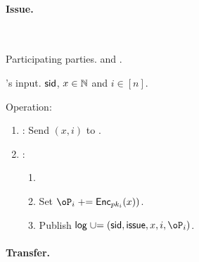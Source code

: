 \paragraph{Issue.}
\begin{protocol}~\label{prot:ConfidentialTransactions:Issue}
	\item[Participating parties.] \Ic and \Cc.
	
	
	\item[\Cc's input.] $\mathsf{sid}$, $x\in {\mathbb{N}}$ and $i\in [n]$.
	
	\item[Operation:] ~
	
	
	\begin{enumerate}
		
		\item   \Ic: Send $(x,i)$ to \Cc.
		
		\item \Cc:  
		\begin{enumerate}
			\item {}
			
			\item Set $\oP_i \pluseq \Enc_{pk_i}(x))$.
				
		\item Publish $\historylog \unioneq (\sid,\issue,x,i,\oP_i)$.
				 	
		\end{enumerate}
		
	\end{enumerate}
\end{protocol}

\paragraph{Transfer.}

\newcommand{\RPs}{{\sf rp}}
\newcommand{\rRP}{\cR_\RPs}

\newcommand{\rRPDef}
{
	\set{((pk,A),(a,r))\colon \Enc_{pk}(a;r)= A \sland a\in [\psize]}
}


\newcommand{\Eqs}{{\sf eq}}
\newcommand{\rEQ}{\cR_\Eqs}

\newcommand{\rEQDef}
{
	\set{((pk_0,pk_1,A_0,A_1),(a,r_0,r_1))\colon \forall i\in \zo \; \Enc_{pk_i}(a;r_i)= A_i}
}

\newcommand{\Lrgs}{{\sf lrger}}
\newcommand{\rLrg}{\cR_\Lrgs}

\newcommand{\rLrgDef}
{
	\set{((pk,A_0,A_1),(a_0,r_0,a_1,r_1))\colon \forall i\in \zo \; \Enc_{pk}(a_i;r_i)= A_i \sland a_1 -a_0 \in [q]} 
}

